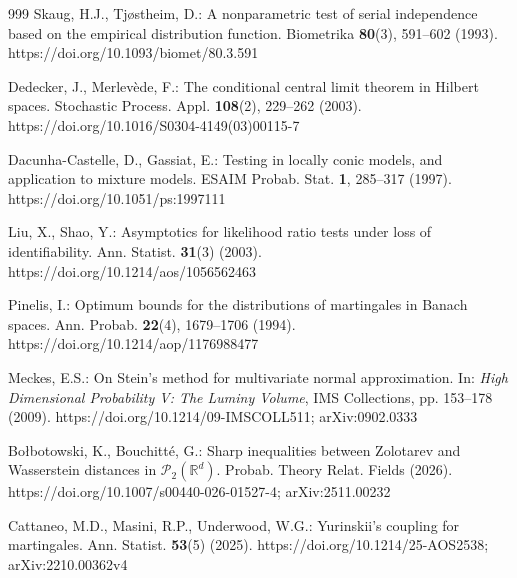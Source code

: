 \begin{thebibliography}{999}
Skaug, H.J., Tj\o stheim, D.: A nonparametric test of serial independence
based on the empirical distribution function. Biometrika \textbf{80}(3),
591--602 (1993). https://doi.org/10.1093/biomet/80.3.591

Dedecker, J., Merlev\`ede, F.: The conditional central limit theorem in
Hilbert spaces. Stochastic Process. Appl. \textbf{108}(2), 229--262 (2003).
https://doi.org/10.1016/S0304-4149(03)00115-7

Dacunha-Castelle, D., Gassiat, E.: Testing in locally conic models, and
application to mixture models. ESAIM Probab. Stat. \textbf{1}, 285--317
(1997). https://doi.org/10.1051/ps:1997111

Liu, X., Shao, Y.: Asymptotics for likelihood ratio tests under loss of
identifiability. Ann. Statist. \textbf{31}(3) (2003).
https://doi.org/10.1214/aos/1056562463

Pinelis, I.: Optimum bounds for the distributions of martingales in Banach
spaces. Ann. Probab. \textbf{22}(4), 1679--1706 (1994).
https://doi.org/10.1214/aop/1176988477

Meckes, E.S.: On Stein's method for multivariate normal approximation.
In: \emph{High Dimensional Probability V: The Luminy Volume}, IMS Collections,
pp. 153--178 (2009). https://doi.org/10.1214/09-IMSCOLL511;
arXiv:0902.0333

Bo{\l}botowski, K., Bouchitt\'e, G.: Sharp inequalities between Zolotarev and
Wasserstein distances in $\mathcal P_2(\mathbb R^d)$. Probab. Theory Relat.
Fields (2026). https://doi.org/10.1007/s00440-026-01527-4;
arXiv:2511.00232

Cattaneo, M.D., Masini, R.P., Underwood, W.G.: Yurinskii's coupling for
martingales. Ann. Statist. \textbf{53}(5) (2025).
https://doi.org/10.1214/25-AOS2538;
arXiv:2210.00362v4

\end{thebibliography}
